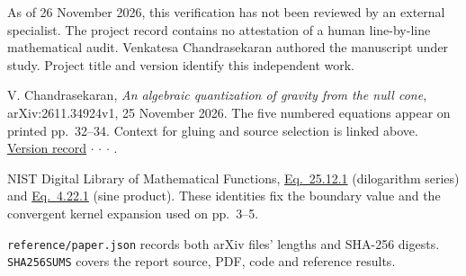 As of 26 November 2026, this verification has not been reviewed by an external specialist. The project record contains no attestation of a human line-by-line mathematical audit. Venkatesa Chandrasekaran authored the manuscript under study. Project title and version identify this independent work.

V. Chandrasekaran, \textit{An algebraic quantization of gravity from the null cone}, arXiv:2611.34924v1, 25 November 2026. The five numbered equations appear on printed pp.~32--34. Context for gluing and source selection is linked above. \href{https://arxiv.org/abs/2611.34924v1}{Version record} $\cdot$  $\cdot$  $\cdot$ .

NIST Digital Library of Mathematical Functions, \href{https://dlmf.nist.gov/25.12.E1}{Eq.~25.12.1} (dilogarithm series) and \href{https://dlmf.nist.gov/4.22.E1}{Eq.~4.22.1} (sine product). These identities fix the boundary value and the convergent kernel expansion used on pp.~3--5.

\texttt{reference/paper.json} records both arXiv files' lengths and SHA-256 digests. \texttt{SHA256SUMS} covers the report source, PDF, code and reference results.
